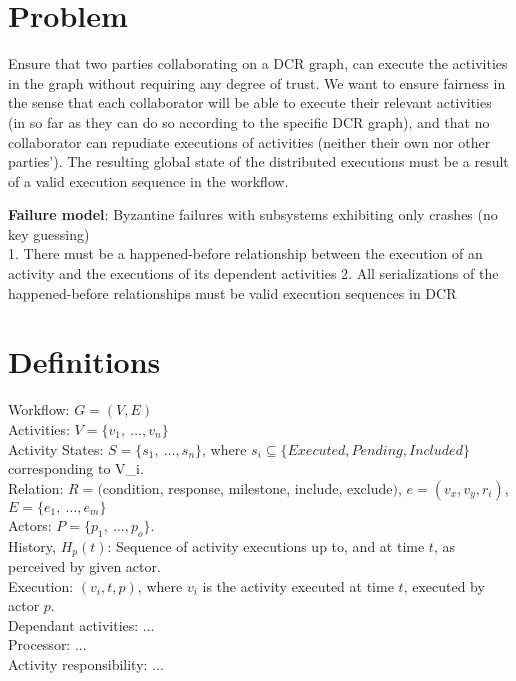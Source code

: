 \documentclass{article}
\begin{document}
	\section*{Problem}
	Ensure that two parties collaborating on a DCR graph, can execute the activities in the graph without requiring any degree of trust. We want to ensure fairness in the sense that each collaborator will be able to execute their relevant activities (in so far as they can do so according to the specific DCR graph), and that no collaborator can repudiate executions of activities (neither their own nor other parties').
	The resulting global state of the distributed executions must be a result of a valid execution sequence in the workflow. %


	\textbf{Failure model}: Byzantine failures with subsystems exhibiting only crashes (no key guessing)\\ %

	1. There must be a happened-before relationship between the execution of an activity and the executions of its dependent activities %
	2. All serializations of the happened-before relationships must be valid execution sequences in DCR %

	\section*{Definitions}
	\noindent
	Workflow: $G=(V,E)$ \\
	Activities: $V=\{v_1,\ \dots, v_n\}$ \\
	Activity States: $S=\{s_1,\ \dots, s_n\}$, where $s_i \subseteq \{Executed, Pending, Included\}$ corresponding to V_i.\\
	Relation: $R=($condition, response, milestone, include, exclude$)$, $e=(v_x, v_y, r_i)$, $E=\{e_1,\ \dots, e_m\}$\\
	Actors: $P =\{p_1,\ \dots, p_o\}$.\\ %
	History, $H_p(t)$: Sequence of activity executions up to, and at time $t$, as perceived by given actor.\\
	Execution: $(v_i, t, p)$, where $v_i$ is the activity executed at time $t$, executed by actor $p$.\\
	Dependant activities: ... \\
	Processor: ... \\
	Activity responsibility: ... \\
\end{document}
